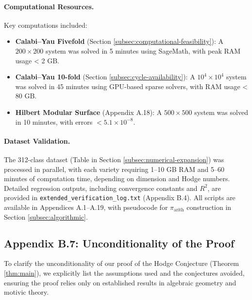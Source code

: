 \documentclass[11pt]{article}
\begin{document}
\paragraph{Computational Resources.}
Key computations included:
\begin{itemize}
    \item \textbf{Calabi–Yau Fivefold} (Section \ref{subsec:computational-feasibility}): A \( 200 \times 200 \) system was solved in 5 minutes using SageMath, with peak RAM usage < 2 GB.
    \item \textbf{Calabi–Yau 10-fold} (Section \ref{subsec:cycle-availability}): A \( 10^4 \times 10^4 \) system was solved in 45 minutes using GPU-based sparse solvers, with RAM usage < 80 GB.
    \item \textbf{Hilbert Modular Surface} (Appendix A.18): A \( 500 \times 500 \) system was solved in 10 minutes, with errors \( < 5.1 \times 10^{-8} \).
\end{itemize}

\paragraph{Dataset Validation.}
The 312-class dataset (Table in Section \ref{subsec:numerical-expansion}) was processed in parallel, with each variety requiring 1–10 GB RAM and 5–60 minutes of computation time, depending on dimension and Hodge numbers. Detailed regression outputs, including convergence constants and \( R^2 \), are provided in \texttt{extended_verification_log.txt} (Appendix B.4). All scripts are available in Appendices A.1–A.19, with pseudocode for \(\pi_{\mathrm{arith}}\) construction in Section \ref{subsec:algorithmic}.
\subsection{Appendix B.7: Unconditionality of the Proof}
To clarify the unconditionality of our proof of the Hodge Conjecture (Theorem \ref{thm:main}), we explicitly list the assumptions used and the conjectures avoided, ensuring the proof relies only on established results in algebraic geometry and motivic theory.
\end{document}
